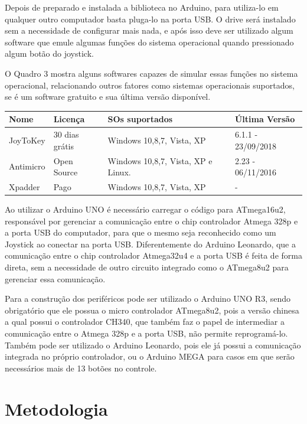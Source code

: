\documentclass[
	12pt,			%
	openright,		%
	oneside,			%
	a4paper,			%
	chapter=TITLE,		%
	english,			%
	brazil,			%
	]{abntex2}
\begin{document}
Depois de preparado e instalada a biblioteca no Arduino, para utiliza-lo em qualquer outro computador basta pluga-lo na porta USB. O drive será instalado sem a necessidade de configurar mais nada, e após isso deve ser utilizado algum software que emule algumas funções do sistema operacional quando pressionado algum botão do joystick.

O Quadro 3 mostra alguns softwares capazes de simular essas funções no sistema operacional, relacionando outros fatores como sistemas operacionais suportados, se é um software gratuito e sua última versão disponível. 

{
\centering
\footnotesize
\begin{tabular}{|p{2cm}|p{3cm}|p{6cm}|p{3cm}|}
\hline
\textbf{Nome} & \textbf{Licença}  & \textbf{SOs suportados}  & \textbf{Última Versão}\\
\hline
JoyToKey	&30 dias grátis				&Windows 10,8,7, Vista, XP		&6.1.1 - 23/09/2018\\
\hline
Antimicro	&Open Source				&Windows 10,8,7, Vista, XP e Linux.	&2.23 - 06/11/2016\\
\hline
Xpadder	&Pago						&Windows 10,8,7, Vista, XP 		&-\\
\hline
\end{tabular}
}


Ao utilizar o Arduino UNO é necessário carregar o código para ATmega16u2, responsável por gerenciar a comunicação entre o chip controlador Atmega 328p e a porta USB do computador, para que o mesmo seja reconhecido como um Joystick ao conectar na porta USB. Diferentemente do Arduino Leonardo, que a comunicação entre o chip controlador Atmega32u4 e a porta USB é feita de forma direta, sem a necessidade de outro circuito integrado como o ATmega8u2 para gerenciar essa comunicação. 

Para a construção dos periféricos pode ser utilizado o Arduino UNO R3, sendo obrigatório que ele possua o micro controlador ATmega8u2, pois a versão chinesa a qual possui o controlador CH340, que também faz o papel de intermediar a comunicação entre o Atmega 328p e a porta USB, não permite reprogramá-lo. Também pode ser utilizado o Arduino Leonardo, pois ele já possui a comunicação integrada no próprio controlador, ou o Arduino MEGA para casos em que serão necessários mais de 13 botões no controle.

\chapter{Metodologia}
\label{met}
\end{document}
